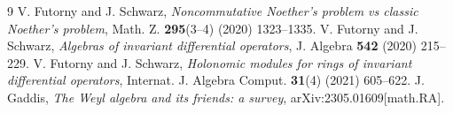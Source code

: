 \documentclass[12pt, a4paper]{amsart}
\begin{document}
\begin{thebibliography}{9}
{\sc V. Futorny and J. Schwarz},
{\em Noncommutative Noether's problem vs classic Noether's problem},
Math. Z. {\bf 295}(3--4) (2020) 1323--1335.%
{\sc V. Futorny and J. Schwarz},
{\em Algebras of invariant differential operators},
J. Algebra {\bf 542} (2020) 215--229.%
{\sc V. Futorny and J. Schwarz},
{\em Holonomic modules for rings of invariant differential operators},
Internat. J. Algebra Comput. {\bf 31}(4) (2021) 605--622.
{\sc J. Gaddis},
{\em The Weyl algebra and its friends: a survey}, arXiv:2305.01609[math.RA].

\end{thebibliography}
\end{document}
